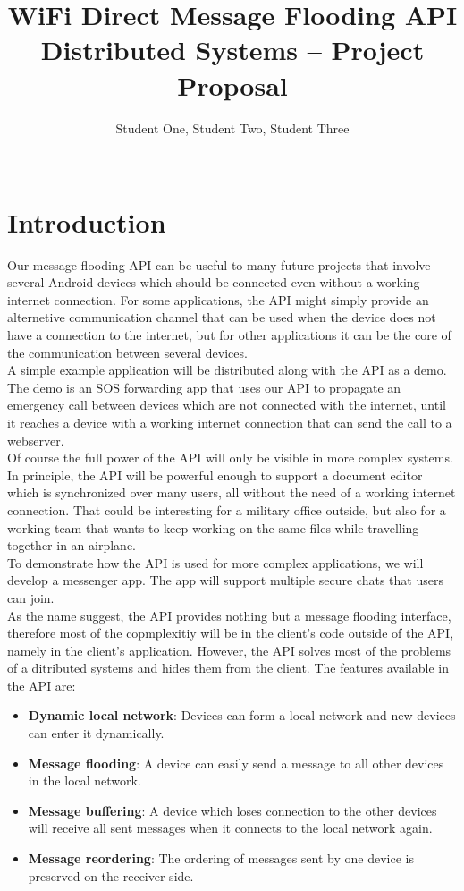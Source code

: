\documentclass{report}
\title{WiFi Direct Message Flooding API \\
\normalsize{Distributed Systems -- Project Proposal}}
\author{
%
%
\alignauthor \normalsize{Student One,  Student Two, Student Three}\\
	\affaddr{\normalsize{ETH ID-1 XX-XXX-XXX, ETH ID-2 XX-XXX-XXX, ETH ID-3 XX-XXX-XXX}}\\
	\email{\normalsize{one@student.ethz.ch, two@student.ethz.ch, three@student.ethz.ch}}
}
\begin{document}
	
	\maketitle
	
	\begin{abstract}
	\end{abstract}
	\section{Introduction}
		Our message flooding API can be useful to many future projects that involve several Android devices which should be connected even without a working internet connection. For some applications, the API might simply provide an alternetive communication channel that can be used when the device does not have a connection to the internet, but for other applications it can be the core of the communication between several devices. \\
		A simple example application will be distributed along with the API as a demo. The demo is an SOS forwarding app that uses our API to propagate an emergency call between devices which are not connected with the internet, until it reaches a device with a working internet connection that can send the call to a webserver. \\
		Of course the full power of the API will only be visible in more complex systems. In principle, the API will be powerful enough to support a document editor which is synchronized over many users, all without the need of a working internet connection. That could be interesting for a military office outside, but also for a working team that wants to keep working on the same files while travelling together in an airplane. \\
		To demonstrate how the API is used for more complex applications, we will develop a messenger app. The app will support multiple secure chats that users can join. \\
		As the name suggest, the API provides nothing but a message flooding interface, therefore most of the copmplexitiy will be in the client's code outside of the API, namely in the client's application. However, the API solves most of the problems of a ditributed systems and hides them from the client. The features available in the API are:
		\begin{itemize}
        	\item {\bf Dynamic local network}: Devices can form a local network and new devices can enter it dynamically.
        	\item {\bf Message flooding}: A device can easily send a message to all other devices in the local network.
        	\item {\bf Message buffering}: A device which loses connection to the other devices will receive all sent messages when it connects to the local network again.
        	\item {\bf Message reordering}: The ordering of messages sent by one device is preserved on the receiver side.
		\end{itemize}
		
\end{document}

